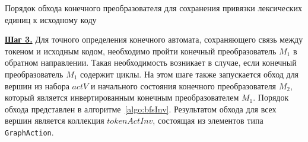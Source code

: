 \documentclass[10pt, conference, compsocconf]{IEEEtran}
\begin{document}
\begin{algorithm}
\begin{algorithmic}

                
                \EndIf
                \EndIf
            \Else
                    \Else
                    \EndIf    
                \Else
                \EndIf
            \EndIf
        \EndFor
    \EndIf
\EndWhile
\EndFunction
\caption{Порядок обхода конечного преобразователя для сохранения привязки лексических единиц к исходному коду}
\label{algo:bfs}
\end{algorithmic}
\end{algorithm}

\textbf{\underline{Шаг 3.}} Для точного определения конечного автомата, сохраняющего связь между токеном и исходным кодом, необходимо пройти конечный преобразователь $M_1$ в обратном направлении. Такая необходимость возникает в случае, если конечный преобразователь $M_1$ содержит циклы. На этом шаге также запускается обход для вершин из набора  $actV$  и начального состояния конечного преобразователя $M_2$, который является инвертированным конечным преобразователем $M_1$. Порядок обхода представлен в алгоритме~\ref{algo:bfsInv}. Результатом обхода для всех вершин является коллекция $tokenActInv$, состоящая из элементов типа \verb|GraphAction|.
\end{document}
